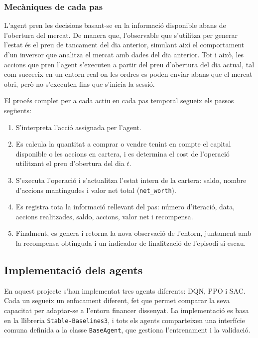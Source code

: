 \documentclass[12pt,a4paper,twoside]{book}
\begin{document}
\subsubsection{Mecàniques de cada pas}

L'agent pren les decisions basant-se en la informació disponible abans de l'obertura del mercat. De manera que, l'observable que s'utilitza per generar l'estat és el preu de tancament del dia anterior, simulant així el comportament d'un inversor que analitza el mercat amb dades del dia anterior. Tot i això, les accions que pren l'agent s'executen a partir del preu d'obertura del dia actual, tal com succeeix en un entorn real on les ordres es poden enviar abans que el mercat obri, però no s'executen fins que s'inicia la sessió.

El procés complet per a cada actiu en cada pas temporal segueix els passos següents:

\begin{enumerate}
    \item S'interpreta l'acció assignada per l'agent.
    \item Es calcula la quantitat a comprar o vendre tenint en compte el capital disponible o les accions en cartera, i es determina el cost de l'operació utilitzant el preu d'obertura del dia $t$.
    \item S'executa l'operació i s'actualitza l'estat intern de la cartera: saldo, nombre d'accions mantingudes i valor net total (\texttt{net\_worth}).
    \item Es registra tota la informació rellevant del pas: número d'iteració, data, accions realitzades, saldo, accions, valor net i recompensa.
    \item Finalment, es genera i retorna la nova observació de l'entorn, juntament amb la recompensa obtinguda i un indicador de finalització de l'episodi si escau.
\end{enumerate}


\subsection{Implementació dels agents}

En aquest projecte s'han implementat tres agents diferents: DQN, PPO i SAC. Cada un segueix un enfocament diferent, fet que permet comparar la seva capacitat per adaptar-se a l'entorn financer dissenyat. La implementació es basa en la llibreria \texttt{Stable-Baselines3}, i tots els agents comparteixen una interfície comuna definida a la classe \texttt{BaseAgent}, que gestiona l'entrenament i la validació.
\end{document}
